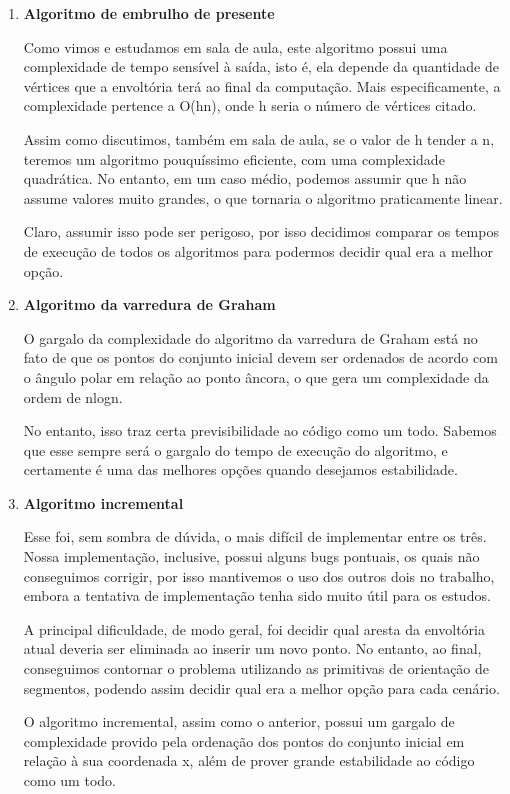 \documentclass{article}
\begin{document}
\begin{enumerate}
    \item \textbf{Algoritmo de embrulho de presente}
    
Como vimos e estudamos em sala de aula, este algoritmo possui uma complexidade de tempo sensível à saída, isto é, ela depende da quantidade de vértices que a envoltória terá ao final da computação. Mais especificamente, a complexidade pertence a O(hn), onde h seria o número de vértices citado.

Assim como discutimos, também em sala de aula, se o valor de h tender a n, teremos um algoritmo pouquíssimo eficiente, com uma complexidade quadrática. No entanto, em um caso médio, podemos assumir que h não assume valores muito grandes, o que tornaria o algoritmo praticamente linear.

Claro, assumir isso pode ser perigoso, por isso decidimos comparar os tempos de execução de todos os algoritmos para podermos decidir qual era a melhor opção. 

    \item \textbf{Algoritmo da varredura de Graham}

O gargalo da complexidade do algoritmo da varredura de Graham está no fato de que os pontos do conjunto inicial devem ser ordenados de acordo com o ângulo polar em relação ao ponto âncora, o que gera um complexidade da ordem de nlogn.

No entanto, isso traz certa previsibilidade ao código como um todo. Sabemos que esse sempre será o gargalo do tempo de execução do algoritmo, e certamente é uma das melhores opções quando desejamos estabilidade.

    \item \textbf{Algoritmo incremental}

Esse foi, sem sombra de dúvida, o mais difícil de implementar entre os três. Nossa implementação, inclusive, possui alguns bugs pontuais, os quais não conseguimos corrigir, por isso mantivemos o uso dos outros dois no trabalho, embora a tentativa de implementação tenha sido muito útil para os estudos.

A principal dificuldade, de modo geral, foi decidir qual aresta da envoltória atual deveria ser eliminada ao inserir um novo ponto. No entanto, ao final, conseguimos contornar o problema utilizando as primitivas de orientação de segmentos, podendo assim decidir qual era a melhor opção para cada cenário.

O algoritmo incremental, assim como o anterior, possui um gargalo de complexidade provido pela ordenação dos pontos do conjunto inicial em relação à sua coordenada x, além de prover grande estabilidade ao código como um todo.
\end{enumerate}
\end{document}
